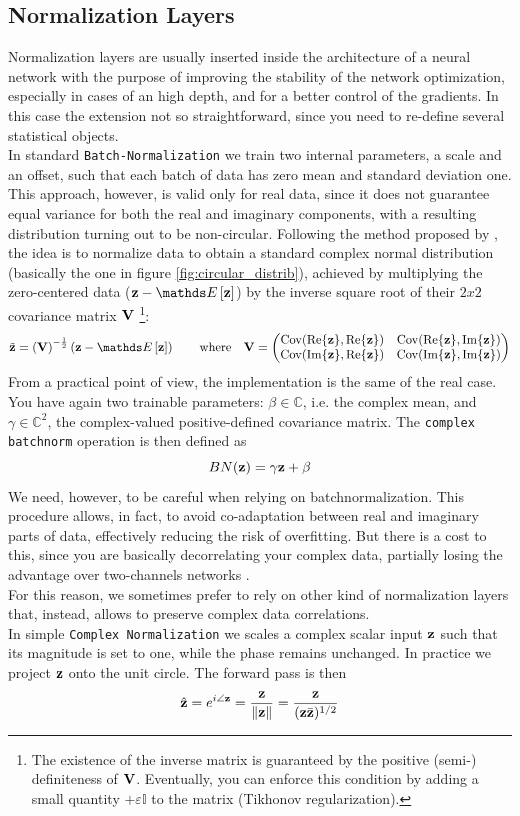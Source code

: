 \documentclass[../main.tex]{subfiles}
\begin{document}
\subsection*{Normalization Layers}
Normalization layers are usually inserted inside the architecture of a neural network with the purpose of improving the stability of the network optimization, especially in cases of an high depth, and for a better control of the gradients. In this case the extension not so straightforward, since you need to re-define several statistical objects.\\
In standard \texttt{Batch-Normalization} we train two internal parameters, a scale and an offset, such that each batch of data has zero mean and standard deviation one. This approach, however, is valid only for real data, since it does not guarantee equal variance for both the real and imaginary components, with a resulting distribution turning out to be non-circular. Following the method proposed by \cite{trabelsi2018deep}, the idea is to normalize data to obtain a standard complex normal distribution (basically the one in figure \ref{fig:circular_distrib}), achieved by multiplying the zero-centered data ($\vb{z}-\Ev{\vb{z}}$) by the inverse square root of their $2x2$ covariance matrix $\vb{V}$ \footnote{The existence of the inverse matrix is guaranteed by the positive (semi-) definiteness of $\vb{V}$. Eventually, you can enforce this condition by adding a small quantity $+\varepsilon\mathds{I}$ to the matrix (Tikhonov regularization).}:
\begin{equation}
\tilde{\vb{z}} = \left(\vb{V}\right)^{-\frac{1}{2}}\left(\vb{z}-\Ev{\vb{z}}\right) \qquad\text{where}\quad \vb{V} =  \mqty(\Cov(\Re{\vb{z}}, \Re{\vb{z}}) & \Cov(\Re{\vb{z}}, \Im{\vb{z}}) \\ \Cov(\Im{\vb{z}}, \Re{\vb{z}}) & \Cov(\Im{\vb{z}}, \Im{\vb{z}}))
\label{eq:cmplx_batchnorm}
\end{equation}
From a practical point of view, the implementation is the same of the real case. You have again two trainable parameters: $\beta\in\mathds{C}$, i.e. the complex mean, and $\gamma\in\mathds{C}^2$, the complex-valued positive-defined covariance matrix. The \texttt{complex batchnorm} operation is then defined as
\[ BN(\vb{z}) = \gamma\vb{z} + \beta \]
We need, however, to be careful when relying on batchnormalization. This procedure allows, in fact, to avoid co-adaptation between real and imaginary parts of data, effectively reducing the risk of overfitting. But there is a cost to this, since you are basically decorrelating your complex data, partially losing the advantage over two-channels networks \cite{cogswell2016reducing}.\\
For this reason, we sometimes prefer to rely on other kind of normalization layers that, instead, allows to preserve complex data correlations.\\
In simple \texttt{Complex Normalization} we scales a complex scalar input $\vb{z}$ such that its magnitude is set to one, while the phase remains unchanged. In practice we project $\vb{z}$ onto the unit circle. The forward pass is then
\[ \hat{\vb{z}} = e^{i\angle \vb{z}} = \frac{\vb{z}}{\norm{\vb{z}}} = \frac{\vb{z}}{(\vb{z}\bar{\vb{z}})^{1/2}} \]
\end{document}
